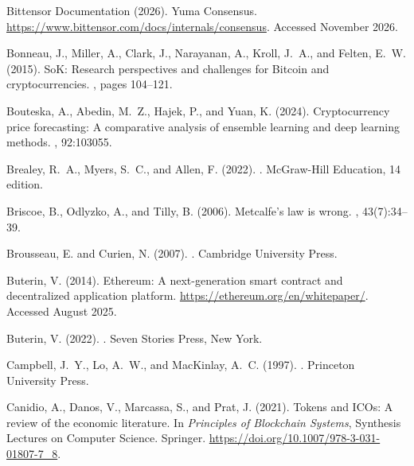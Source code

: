 \documentclass[12pt]{article}
\begin{document}
\begin{thebibliography}{}
{Bittensor Documentation} (2026).
\newblock Yuma Consensus.
\newblock \url{https://www.bittensor.com/docs/internals/consensus}.
\newblock Accessed November 2026.

Bonneau, J., Miller, A., Clark, J., Narayanan, A., Kroll, J.~A., and Felten,
  E.~W. (2015).
\newblock SoK: Research perspectives and challenges for Bitcoin and
  cryptocurrencies.
, pages 104--121.

Bouteska, A., Abedin, M.~Z., Hajek, P., and Yuan, K. (2024).
\newblock Cryptocurrency price forecasting: A comparative analysis of ensemble
  learning and deep learning methods.
, 92:103055.

Brealey, R.~A., Myers, S.~C., and Allen, F. (2022).
.
\newblock McGraw-Hill Education, 14 edition.

Briscoe, B., Odlyzko, A., and Tilly, B. (2006).
\newblock Metcalfe's law is wrong.
, 43(7):34--39.

Brousseau, E. and Curien, N. (2007).
.
\newblock Cambridge University Press.

Buterin, V. (2014).
\newblock Ethereum: A next-generation smart contract and decentralized
  application platform.
\newblock \url{https://ethereum.org/en/whitepaper/}.
\newblock Accessed August 2025.

Buterin, V. (2022).
.
\newblock Seven Stories Press, New York.

Campbell, J.~Y., Lo, A.~W., and MacKinlay, A.~C. (1997).
.
\newblock Princeton University Press.

Canidio, A., Danos, V., Marcassa, S., and Prat, J. (2021).
\newblock Tokens and ICOs: A review of the economic literature.
\newblock In {\em Principles of Blockchain Systems}, Synthesis Lectures on
  Computer Science. Springer.
\newblock \url{https://doi.org/10.1007/978-3-031-01807-7_8}.


\end{thebibliography}
\end{document}
